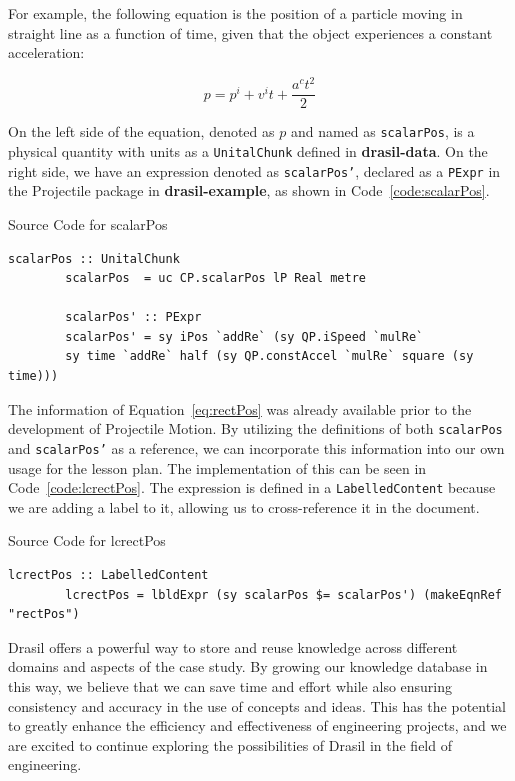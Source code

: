 For example, the following equation is the position of a particle moving in 
straight line as a function of time, given that the object experiences a 
constant acceleration:

\begin{equation}
	\label{eq:rectPos}
	p=p^i+v^it+\frac{a^ct^2}{2}
\end{equation}

On the left side of the equation, denoted as $p$ and named as 
\texttt{scalarPos}, is a physical quantity with units as a \texttt{UnitalChunk} 
defined in \textbf{drasil-data}. On the right side, we have an expression 
denoted as \texttt{scalarPos'}, declared as a \texttt{PExpr} in the Projectile 
package in \textbf{drasil-example}, as shown in Code~\ref{code:scalarPos}. 

\begin{listing}[h!]
	\caption{Source Code for scalarPos} 
	\label{code:scalarPos}
	\begin{lstlisting}[language=haskell1]		
		scalarPos :: UnitalChunk
		scalarPos  = uc CP.scalarPos lP Real metre
		
		scalarPos' :: PExpr
		scalarPos' = sy iPos `addRe` (sy QP.iSpeed `mulRe` 
		sy time `addRe` half (sy QP.constAccel `mulRe` square (sy time)))
	\end{lstlisting}
\end{listing}

The information of Equation~\ref{eq:rectPos} was already available prior to 
the development of Projectile Motion. By utilizing the definitions of both 
\texttt{scalarPos} and \texttt{scalarPos'} as a reference, we can incorporate 
this information into our own usage for the lesson plan. The implementation of 
this can be seen in Code~\ref{code:lcrectPos}. The expression is defined in a 
\texttt{LabelledContent} because we are adding a label to it, allowing us to 
cross-reference it in the document.

\begin{listing}[h!]
	\caption{Source Code for lcrectPos} 
	\label{code:lcrectPos}
	\begin{lstlisting}[language=haskell1]		
		lcrectPos :: LabelledContent
		lcrectPos = lbldExpr (sy scalarPos $= scalarPos') (makeEqnRef "rectPos")
	\end{lstlisting}
\end{listing}

Drasil offers a powerful way to store and reuse knowledge across different 
domains and aspects of the case study. By growing our knowledge database in 
this way, we believe that we can save time and effort while also ensuring 
consistency and accuracy in the use of concepts and ideas. This has the 
potential to greatly enhance the efficiency and effectiveness of engineering 
projects, and we are excited to continue exploring the possibilities of Drasil 
in the field of engineering.